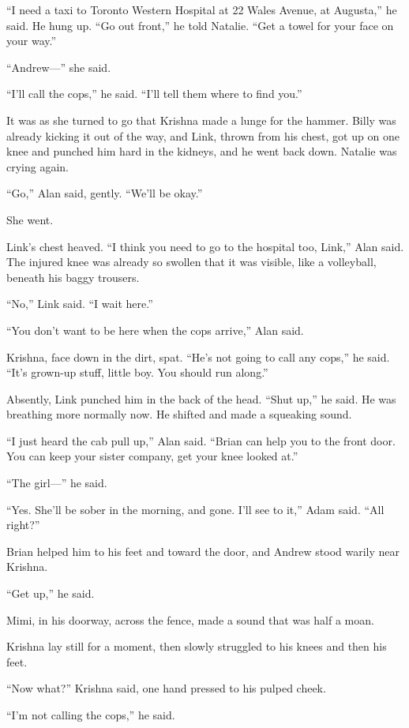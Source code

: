 \documentclass{article}
\begin{document}
``I need a taxi to Toronto Western Hospital at 22 Wales Avenue, at
Augusta,'' he said.  He hung up.  ``Go out front,'' he told Natalie. 
``Get a towel for your face on your way.''

``Andrew---'' she said. 

``I'll call the cops,'' he said.  ``I'll tell them where to find
you.''

It was as she turned to go that Krishna made a lunge for the hammer. 
Billy was already kicking it out of the way, and Link, thrown from his
chest, got up on one knee and punched him hard in the kidneys, and he
went back down.  Natalie was crying again. 

``Go,'' Alan said, gently.  ``We'll be okay.''

She went.

Link's chest heaved.  ``I think you need to go to the hospital too,
Link,'' Alan said.  The injured knee was already so swollen that it
was visible, like a volleyball, beneath his baggy trousers.

``No,'' Link said.  ``I wait here.''

``You don't want to be here when the cops arrive,'' Alan said.

Krishna, face down in the dirt, spat.  ``He's not going to call any
cops,'' he said.  ``It's grown-up stuff, little boy.  You should run
along.''

Absently, Link punched him in the back of the head.  ``Shut up,'' he
said.  He was breathing more normally now.  He shifted and made a
squeaking sound.

``I just heard the cab pull up,'' Alan said.  ``Brian can help you to
the front door.  You can keep your sister company, get your knee
looked at.''

``The girl---'' he said.

``Yes.  She'll be sober in the morning, and gone.  I'll see to it,''
Adam said.  ``All right?''

Brian helped him to his feet and toward the door, and Andrew stood
warily near Krishna.

``Get up,'' he said.

Mimi, in his doorway, across the fence, made a sound that was half a
moan.

Krishna lay still for a moment, then slowly struggled to his knees and
then his feet.

``Now what?'' Krishna said, one hand pressed to his pulped cheek.

``I'm not calling the cops,'' he said.
\end{document}
